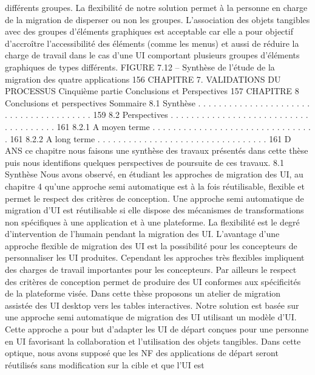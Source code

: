 \documentclass{article}
\begin{document}
diff\'{e}rents groupes. La ﬂexibilit\'{e} de notre solution permet \`{a} la personne en charge de la migration de
disperser ou non les groupes.
L’association des objets tangibles avec des groupes d’\'{e}l\'{e}ments graphiques est acceptable car elle
a pour objectif d’accro\^{i}tre l’accessibilit\'{e} des \'{e}l\'{e}ments (comme les menus) et aussi de r\'{e}duire la charge
de travail dans le cas d’une UI comportant plusieurs groupes d’\'{e}l\'{e}ments graphiques de types diff\'{e}rents.
FIGURE 7.12 – Synth\`{e}se de l’\'{e}tude de la migration des quatre applications
156
CHAPITRE 7. VALIDATIONS DU PROCESSUS
Cinqui\`{e}me partie
Conclusions et Perspectives
157
CHAPITRE 8
Conclusions et perspectives
Sommaire
8.1
Synth\`{e}se
. . . . . . . . . . . . . . . . . . . . . . . . . . . . . . . . . . . . . . . 159
8.2
Perspectives
. . . . . . . . . . . . . . . . . . . . . . . . . . . . . . . . . . . . . 161
8.2.1
A moyen terme . . . . . . . . . . . . . . . . . . . . . . . . . . . . . . . . 161
8.2.2
A long terme . . . . . . . . . . . . . . . . . . . . . . . . . . . . . . . . . 161
D
ANS ce chapitre nous faisons une synth\`{e}se des travaux pr\'{e}sent\'{e}s dans cette th\`{e}se puis nous identiﬁons quelques perspectives de poursuite de ces travaux.
8.1
Synth\`{e}se
Nous avons observ\'{e}, en \'{e}tudiant les approches de migration des UI, au chapitre 4 qu’une approche
semi automatique est \`{a} la fois r\'{e}utilisable, ﬂexible et permet le respect des crit\`{e}res de conception.
Une approche semi automatique de migration d’UI est r\'{e}utilisable si elle dispose des m\'{e}canismes
de transformations non sp\'{e}ciﬁques \`{a} une application et \`{a} une plateforme. La ﬂexibilit\'{e} est le degr\'{e}
d’intervention de l’humain pendant la migration des UI. L’avantage d’une approche ﬂexible de migration des UI est la possibilit\'{e} pour les concepteurs de personnaliser les UI produites. Cependant
les approches tr\`{e}s ﬂexibles impliquent des charges de travail importantes pour les concepteurs. Par
ailleurs le respect des crit\`{e}res de conception permet de produire des UI conformes aux sp\'{e}ciﬁcit\'{e}s
de la plateforme vis\'{e}e.
Dans cette th\`{e}se proposons un atelier de migration assist\'{e}e des UI desktop vers les tables interactives. Notre solution est bas\'{e}e sur une approche semi automatique de migration des UI utilisant un
mod\`{e}le d’UI. Cette approche a pour but d’adapter les UI de d\'{e}part con\c{c}ues pour une personne en UI
favorisant la collaboration et l’utilisation des objets tangibles. Dans cette optique, nous avons suppos\'{e}
que les NF des applications de d\'{e}part seront r\'{e}utilis\'{e}s sans modiﬁcation sur la cible et que l’UI est
\end{document}
